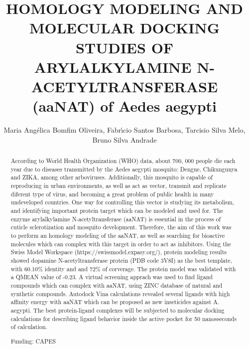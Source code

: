 \documentclass[twoside]{article}
\title{\vspace{-15mm}\fontsize{24pt}{10pt}\selectfont\textbf{ HOMOLOGY MODELING AND MOLECULAR DOCKING STUDIES OF ARYLALKYLAMINE N-ACETYLTRANSFERASE (aaNAT) of Aedes aegypti }} %
\author{ Maria Ang\'elica Bomfim Oliveira, Fabr\'{\i}cio Santos Barbosa, Tarcisio Silva Melo, Bruno Silva Andrade }
\affil{ Universidade Estadual do Sudoeste da Bahia,  Brazil. }
\date{}
\begin{document}
  
  
  \maketitle %
  
  
  \thispagestyle{fancy} %
  
  
  \begin{abstract}
  According to World Health Organization (WHO) data,  about 700, 000 people die each year due to diseases transmitted by the Aedes aegypti mosquito: Dengue,  Chikungunya and ZIKA,  among other arboviruses. Additionally,  this mosquito is capable of reproducing in urban environments,  as well as act as vector,  transmit and replicate diferent type of virus,  and becoming a great problem of public health in many undeveloped countries. One way for controlling this vector is studying its metabolism,  and identifying important protein target which can be modeled and used for. The enzyme arylalkylamine N-acetyltransferase (aaNAT) is essential in the process of cuticle sclerotization and mosquito development. Therefore,  the aim of this work was to perform an homology modeling of the aaNAT,  as well as searching for bioactive molecules which can complex with this target in order to act as inhibitors. Using the Swiss Model Workspace (https://swissmodel.expasy.org/),  protein modeling results showed dopamine N-acetyltransferase protein (PDB code 3V8I) as the best template,  with 60.10\% identity and and 72\% of corverage. The protein model was validated with a QMEAN value of -0.23. A virtual screening apprach was used to find ligand compounds which can complex with aaNAT,  using ZINC database of natural and synthetic compounds. Autodock Vina calculations revealed several ligands with high affinity energy with aaNAT which can be proposed as new inseticides against A. aegypti. The best protein-ligand complexes will be subjected to molecular docking calculations for describing ligand behavior inside the active pocket for 50 nanosseconds of calculation.
  
  Funding: CAPES \\ 
  \end{abstract}
  
\end{document}
